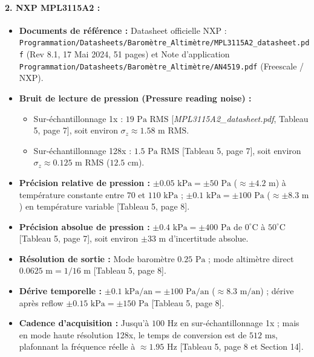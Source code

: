 \documentclass[../Formulations_Kalman.tex]{subfiles}
\begin{document}
\paragraph{2. NXP MPL3115A2 :}
\begin{itemize}
    \item \textbf{Documents de référence :} Datasheet officielle NXP : \texttt{Programmation/Datasheets/Baromètre\_Altimètre/MPL3115A2\_datasheet.pdf} (Rev 8.1, 17 Mai 2024, 51 pages) et Note d'application \texttt{Programmation/Datasheets/Baromètre\_Altimètre/AN4519.pdf} (Freescale / NXP).
    \item \textbf{Bruit de lecture de pression (Pressure reading noise) :}
    \begin{itemize}
        \item Sur-échantillonnage 1x : $19\text{ Pa RMS}$ [\textit{MPL3115A2\_datasheet.pdf}, Tableau 5, page 7], soit environ $\sigma_z \approx 1.58\text{ m RMS}$.
        \item Sur-échantillonnage 128x : $1.5\text{ Pa RMS}$ [Tableau 5, page 7], soit environ $\sigma_z \approx 0.125\text{ m RMS}$ ($12.5\text{ cm}$).
    \end{itemize}
    \item \textbf{Précision relative de pression :} $\pm 0.05\text{ kPa} = \pm 50\text{ Pa}$ ($\approx \pm 4.2\text{ m}$) à température constante entre $70$ et $110\text{ kPa}$ ; $\pm 0.1\text{ kPa} = \pm 100\text{ Pa}$ ($\approx \pm 8.3\text{ m}$) en température variable [Tableau 5, page 8].
    \item \textbf{Précision absolue de pression :} $\pm 0.4\text{ kPa} = \pm 400\text{ Pa}$ de $0^\circ\text{C}$ à $50^\circ\text{C}$ [Tableau 5, page 7], soit environ $\pm 33\text{ m}$ d'incertitude absolue.
    \item \textbf{Résolution de sortie :} Mode baromètre $0.25\text{ Pa}$ ; mode altimètre direct $0.0625\text{ m} = 1/16\text{ m}$ [Tableau 5, page 8].
    \item \textbf{Dérive temporelle :} $\pm 0.1\text{ kPa/an} = \pm 100\text{ Pa/an}$ ($\approx 8.3\text{ m/an}$) ; dérive après reflow $\pm 0.15\text{ kPa} = \pm 150\text{ Pa}$ [Tableau 5, page 8].
    \item \textbf{Cadence d'acquisition :} Jusqu'à $100\text{ Hz}$ en sur-échantillonnage 1x ; mais en mode haute résolution 128x, le temps de conversion est de $512\text{ ms}$, plafonnant la fréquence réelle à $\approx 1.95\text{ Hz}$ [Tableau 5, page 8 et Section 14].
\end{itemize}
\end{document}
